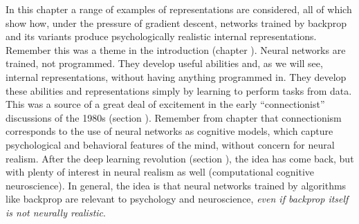 In this chapter a range of examples of representations are considered, all of which show how, under the pressure of gradient descent, networks trained by backprop and its variants produce psychologically realistic internal representations. Remember this was a theme in the introduction (chapter ). Neural networks are trained, not programmed. They develop useful abilities and, as we will see, internal representations, without having anything programmed in. They develop these abilities and representations simply by learning to perform tasks from data. This was a source of a great deal of excitement in the early ``connectionist'' discussions of the 1980s (section ). Remember from chapter  that connectionism corresponds to the use of neural networks as cognitive models, which capture psychological and behavioral features of the mind, without concern for neural realism. After the deep learning revolution (section ), the idea has come back, but with plenty of interest in neural realism as well (computational cognitive neuroscience).  In general, the idea is that neural networks trained by algorithms like backprop are relevant to psychology and neuroscience, \emph{even if backprop itself is not neurally realistic}.

